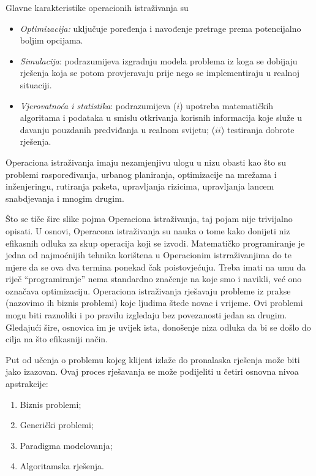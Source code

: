 \documentclass[a4paper, utf8, 11pt, colorlinks]{book}
\begin{document}
Glavne karakteristike operacionih istraživanja su
\begin{itemize}
    \item \emph{Optimizacija:} %
     uključuje poređenja i navođenje pretrage prema potencijalno boljim opcijama.
    \item \emph{Simulacija}:  podrazumijeva izgradnju modela problema iz koga se dobijaju rješenja koja se potom provjeravaju prije nego se implementiraju u realnoj situaciji.
    \item \emph{Vjerovatnoća i statistika}:  podrazumijeva ($i$) upotreba matematičkih algoritama i podataka u smislu otkrivanja korisnih informacija koje služe u davanju pouzdanih predviđanja u realnom svijetu; ($ii$) testiranja dobrote rješenja.
\end{itemize}
 
 Operaciona istraživanja imaju nezamjenjivu ulogu u nizu obasti kao što su problemi raspoređivanja, urbanog planiranja, optimizacije na mrežama i inženjeringu, rutiranja paketa, upravljanja rizicima, upravljanja lancem snabdjevanja i mnogim drugim. 

 Što se tiče   šire slike pojma Operaciona istraživanja, taj pojam nije trivijalno opisati. U osnovi, Operacona istraživanja su nauka o tome kako donijeti niz efikasnih odluka za skup operacija koji se izvodi. Matematičko programiranje je jedna od najmoćnijih tehnika 
 korištena u Operacionim istrraživanjima do te mjere da  se   ova dva termina ponekad čak poistovjećuju. Treba imati na umu da riječ ``programiranje'' nema standardno značenje na koje smo i navikli, već ono označava optimizaciju. Operaciona istraživanja rješavaju probleme iz prakse (nazovimo ih biznis problemi) koje ljudima štede novac i vrijeme. Ovi problemi mogu biti raznoliki i po pravilu izgledaju bez povezanosti jedan sa drugim. Gledajući šire, osnovica im je uvijek ista, donošenje niza odluka da bi se došlo do cilja na što efikasniji način.  %

  Put od učenja o problemu kojeg klijent izlaže do pronalaska rješenja može biti jako izazovan. Ovaj proces rješavanja se može podijeliti u četiri osnovna nivoa apstrakcije:
  \begin{enumerate}
      \item Biznis problemi;
      \item Generički problemi; 
      \item Paradigma modelovanja;
      \item Algoritamska rješenja. 
  \end{enumerate}
  
\end{document}
